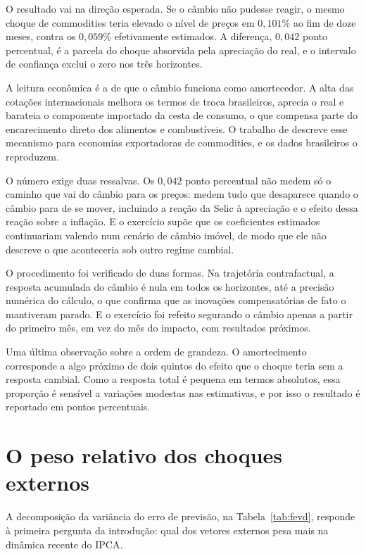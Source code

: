 \documentclass[12pt,openright,oneside,a4paper,portuguese,brazil]{abntex2}
\begin{document}
O resultado vai na direção esperada. Se o câmbio não pudesse reagir, o mesmo
choque de commodities teria elevado o nível de preços em $0{,}101\%$ ao fim de
doze meses, contra os $0{,}059\%$ efetivamente estimados. A diferença,
$0{,}042$ ponto percentual, é a parcela do choque absorvida pela apreciação do
real, e o intervalo de confiança exclui o zero nos três horizontes.

A leitura econômica é a de que o câmbio funciona como amortecedor. A alta das
cotações internacionais melhora os termos de troca brasileiros, aprecia o real
e barateia o componente importado da cesta de consumo, o que compensa parte do
encarecimento direto dos alimentos e combustíveis. O trabalho de
 descreve esse mecanismo para economias exportadoras de
commodities, e os dados brasileiros o reproduzem.

O número exige duas ressalvas. Os $0{,}042$ ponto percentual não medem só o
caminho que vai do câmbio para os preços: medem tudo que desaparece quando o
câmbio para de se mover, incluindo a reação da Selic à apreciação e o efeito
dessa reação sobre a inflação. E o exercício supõe que os coeficientes
estimados continuariam valendo num cenário de câmbio imóvel, de modo que ele
não descreve o que aconteceria sob outro regime cambial.

O procedimento foi verificado de duas formas. Na trajetória contrafactual, a
resposta acumulada do câmbio é nula em todos os horizontes, até a precisão
numérica do cálculo, o que confirma que as inovações compensatórias de fato o
mantiveram parado. E o exercício foi refeito segurando o câmbio apenas a
partir do primeiro mês, em vez do mês do impacto, com resultados próximos.

Uma última observação sobre a ordem de grandeza. O amortecimento corresponde a algo próximo de dois quintos do efeito que o
choque teria sem a resposta cambial. Como a resposta total é pequena em termos absolutos, essa
proporção é sensível a variações modestas nas estimativas, e por isso o
resultado é reportado em pontos percentuais.

\section{O peso relativo dos choques externos}
\label{sec:resultadofevd}

A decomposição da variância do erro de previsão, na
Tabela~\ref{tab:fevd}, responde à primeira pergunta da introdução: qual dos
vetores externos pesa mais na dinâmica recente do IPCA.
\end{document}
